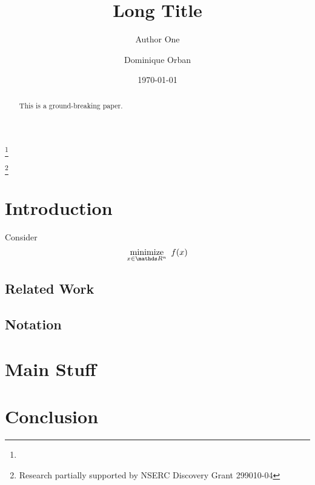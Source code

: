 \documentclass{amsart}
\begin{document}
\linenumbers

\title[Short Title]{%
  Long Title
}

\author[A. One]{Author One}
\address{%
  Some Lab, Some Univeristy, Some Place
}
\thanks{}

\author[D. Orban]{Dominique Orban}
\address{%
  GERAD and
  Mathematics and Industrial Engineering Department \\
  \'Ecole Polytechnique, Montr\'eal, Canada
}
\thanks{Research partially supported by NSERC Discovery Grant 299010-04}



\date{\today}

\begin{abstract}
  This is a ground-breaking paper.
\end{abstract}

\maketitle

\pagestyle{myheadings}

\tableofcontents
\listoftodos\relax   %

\section{Introduction}

Consider
\begin{equation}
  \label{eq:nlp}
  \minimize{x \in  \R^n} \ f(x)
\end{equation}

\subsection*{Related Work}

\subsection*{Notation}


\section{Main Stuff}

\section{Conclusion}




\end{document}
